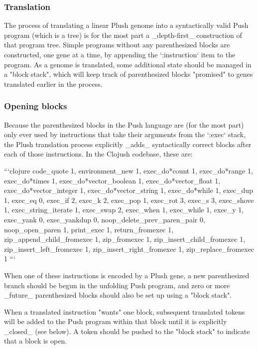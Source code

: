 \subsubsection{ Translation}

The process of translating a linear Plush genome into a syntactically valid Push program (which is a tree) is for the most part a \_depth-first\_ construction of that program tree. Simple programs without any parenthesized blocks are constructed, one gene at a time, by appending the `:instruction` item to the program. As a genome is translated, some additional state should be managed in a "block stack", which will keep track of parenthesized blocks "promised" to genes translated earlier in the process.

\subsubsection{ Opening blocks}

Because the parenthesized blocks in the Push language are (for the most part) only ever used by instructions that take their arguments from the `:exec` stack, the Plush translation process explicitly \_adds\_ syntactically correct blocks after each of those instructions. In the Clojush codebase, these are:

```clojure
    {code\_quote 1,
     environment\_new 1,
     exec\_do*count 1,
     exec\_do*range 1,
     exec\_do*times 1,
     exec\_do*vector\_boolean 1,
     exec\_do*vector\_float 1,
     exec\_do*vector\_integer 1,
     exec\_do*vector\_string 1,
     exec\_do*while 1,
     exec\_dup 1,
     exec\_eq 0,
     exec\_if 2,
     exec\_k 2,
     exec\_pop 1,
     exec\_rot 3,
     exec\_s 3,
     exec\_shove 1,
     exec\_string\_iterate 1,
     exec\_swap 2,
     exec\_when 1,
     exec\_while 1,
     exec\_y 1,
     exec\_yank 0,
     exec\_yankdup 0,
     noop\_delete\_prev\_paren\_pair 0,
     noop\_open\_paren 1,
     print\_exec 1,
     return\_fromexec 1,
     zip\_append\_child\_fromexec 1,
     zip\_fromexec 1,
     zip\_insert\_child\_fromexec 1,
     zip\_insert\_left\_fromexec 1,
     zip\_insert\_right\_fromexec 1,
     zip\_replace\_fromexec 1}
```

When one of these instructions is encoded by a Plush gene, a new parenthesized branch should be begun in the unfolding Push program, and zero or more \_future\_ parenthesized blocks should also be set up using a "block stack".

When a translated instruction "wants" one block, subsequent translated tokens will be added to the Push program within that block until it is explicitly \_closed\_ (see below). A token should be pushed to the "block stack" to indicate that a block is open.

